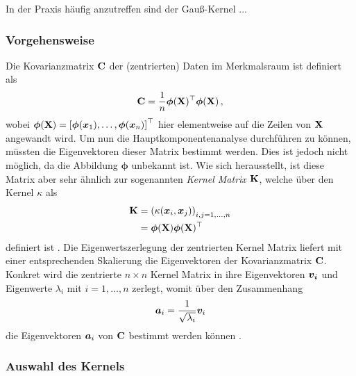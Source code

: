In der Praxis häufig anzutreffen sind der Gauß-Kernel ...


\subsubsection{Vorgehensweise}
\label{ch:MethodenDerDimRed:statistisch:kPCA:Vorgehensweise}
Die Kovarianzmatrix $\mathbf{C}$ der (zentrierten) Daten im Merkmalsraum ist definiert als
\begin{equation}
	\mathbf{C} = \frac{1}{n} \bm{\phi}(\mathbf{X})^\top \bm{\phi}(\mathbf{X}) \, ,
\end{equation}
wobei $\bm{\phi}(\mathbf{X}) = \left[ \bm{\phi}(\bm{x}_1), \ldots, \bm{\phi}(\bm{x}_n) \right]^\top$ hier elementweise auf die Zeilen von $\mathbf{X}$ angewandt wird. Um nun die Hauptkomponentenanalyse durchführen zu können, müssten die Eigenvektoren dieser Matrix bestimmt werden. Dies ist jedoch nicht möglich, da die Abbildung $\bm{\phi}$ unbekannt ist. Wie sich herausstellt, ist diese Matrix aber sehr ähnlich zur sogenannten \textit{Kernel Matrix} $\mathbf{K}$, welche über den Kernel $\kappa$ als
\begin{align}
	\mathbf{K} & = \left( \kappa(\bm{x}_i, \bm{x}_j) \right)_{i,j = 1,\ldots,n} \label{eq:kPCA:KernelMatrix_A} \\
	        & = \bm{\phi}(\mathbf{X}) \bm{\phi}(\mathbf{X})^\top \label{eq:kPCA:KernelMatrix_B}
\end{align}
definiert ist \parencite[68]{ShaweTaylor.2011}. Die Eigenwertszerlegung der zentrierten Kernel Matrix liefert mit
einer entsprechenden Skalierung die Eigenvektoren der Kovarianzmatrix $\mathbf{C}$. Konkret wird die
zentrierte $n \times n$ Kernel Matrix in ihre Eigenvektoren $\bm{v_i}$ und Eigenwerte $\lambda_i$
mit $i = 1, \ldots, n$ zerlegt, womit über den Zusammenhang
\begin{equation}
	\label{eq:kPCA:ZusammenhangEigenvektoren}
	\bm{a}_i = \frac{1}{\sqrt{\lambda_i}} \bm{v}_i
\end{equation}
die Eigenvektoren $\bm{a}_i$ von $\mathbf{C}$ bestimmt werden können \parencite[142]{ShaweTaylor.2011}.

\subsubsection{Auswahl des Kernels}
\label{ch:MethodenDerDimRed:statistisch:kPCA:AuswahlKF}

